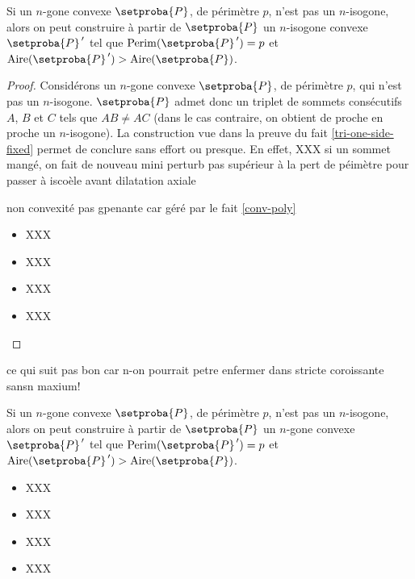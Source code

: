 

\begin{fact} \label{iso-poly}
	Si un $n$-gone convexe $\setproba{P}$, de périmètre $p$, n'est pas un $n$-isogone, alors on peut construire à partir de $\setproba{P}$ un $n$-isogone convexe $\setproba{P}^{\,\prime}$ tel que $\perim{\setproba{P}^{\,\prime}} = p$ et $\area{\setproba{P}^{\,\prime}} > \area{\setproba{P}}$.
\end{fact}


\begin{proof}
	Considérons un $n$-gone convexe $\setproba{P}$, de périmètre $p$, qui n'est pas un $n$-isogone. 
	$\setproba{P}$ admet donc un triplet de sommets consécutifs $A$, $B$ et $C$ tels que $AB \neq AC$ (dans le cas contraire, on obtient de proche en proche un $n$-isogone).
	La construction vue dans la preuve du fait \ref{tri-one-side-fixed} permet de conclure sans effort ou presque.
	En effet,
	XXX
	si un sommet mangé, on fait de nouveau mini perturb pas supérieur à la pert de péimètre pour passer à iscoèle avant dilatation axiale
	
	non convexité pas gpenante car géré par le fait \ref{conv-poly}
	\begin{itemize}
		\item XXX

		\item XXX

		\item XXX

		\item XXX
	\end{itemize}
\end{proof}




\begin{remark}
	ce qui suit pas bon car n-on pourrait petre enfermer dans stricte coroissante sansn maxium!
	
	Si un $n$-gone convexe $\setproba{P}$, de périmètre $p$, n'est pas un $n$-isogone, alors on peut construire à partir de $\setproba{P}$ un $n$-gone convexe $\setproba{P}^{\,\prime}$ tel que $\perim{\setproba{P}^{\,\prime}} = p$ et $\area{\setproba{P}^{\,\prime}} > \area{\setproba{P}}$.
	\begin{itemize}
		\item XXX

		\item XXX

		\item XXX

		\item XXX
	\end{itemize}
\end{remark}


